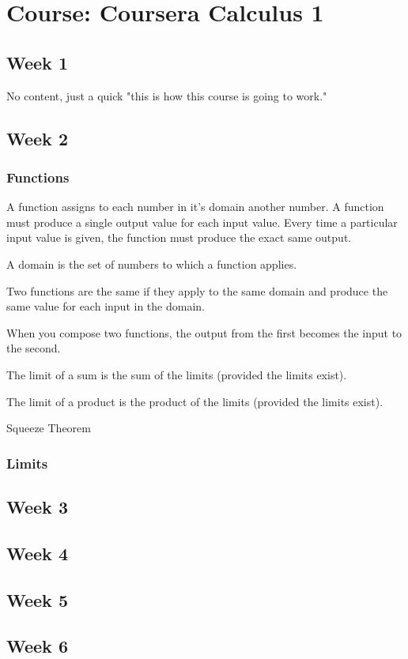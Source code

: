 \chapter{Course: Coursera Calculus 1}
\section{Week 1}
No content, just a quick "this is how this course is going to work."

\section{Week 2}
\subsection{Functions}

A function assigns to each number in it's domain another number. A function must produce a single output value for each input value. Every time a particular input value is given, the function must produce the exact same output.

A domain is the set of numbers to which a function applies.

Two functions are the same if they apply to the same domain and produce the same value for each input in the domain.

When you compose two functions, the output from the first becomes the input to the second.

The limit of a sum is the sum of the limits (provided the limits exist).

The limit of a product is the product of the limits (provided the limits exist).

Squeeze Theorem 

\subsection{Limits}

\section{Week 3}
\section{Week 4}
\section{Week 5}
\section{Week 6}
